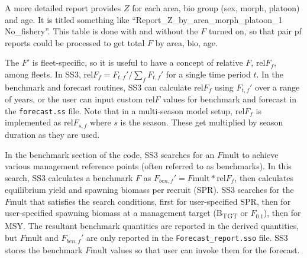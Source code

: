 A more detailed report provides $Z$ for each area, bio group (sex, morph, platoon) and age. It is titled something like ``Report\_Z\_by\_area\_morph\_platoon\_1 No\_fishery''. This table is done with and without the $F$ turned on, so that pair pf reports could be processed to get total $F$ by area, bio, age.

The $F'$ is fleet-specific, so it is useful to have a concept of relative $F$, $\text{rel}F_f$, among fleets. In SS3, $\text{rel}F_f= F_{t,f}'/\sum_{f}^{}F_{t,f}'$ for a single time period $t$. In the benchmark and forecast routines, SS3 can calculate $\text{rel}F_f$ using $F_{t,f}'$ over a range of years, or the user can input custom $\text{rel}F$ values for benchmark and forecast in the \texttt{forecast.ss} file. Note that in a multi-season model setup, $\text{rel}F_f$ is implemented as $\text{rel}F_{s,f}$ where $s$ is the season. These get multiplied by season duration as they are used.

In the benchmark section of the code, SS3 searches for an $F\text{mult}$ to achieve various management reference points (often referred to as benchmarks). In this search, SS3 calculates a benchmark $F$ as $F_{ben,f}' = F\text{mult} * \text{rel}F_f$, then calculates equilibrium yield and spawning biomass per recruit (SPR). SS3 searches for the $F\text{mult}$ that satisfies the search conditions, first for user-specified SPR, then for user-specified spawning biomass at a management target (B\textsubscript{TGT} or $F_{0.1}$), then for MSY. The resultant benchmark quantities are reported in the derived quantities, but $F\text{mult}$ and $F_{ben,f}'$ are only reported in the \texttt{Forecast\_report.sso} file. SS3 stores the benchmark $F\text{mult}$ values so that user can invoke them for the forecast.

